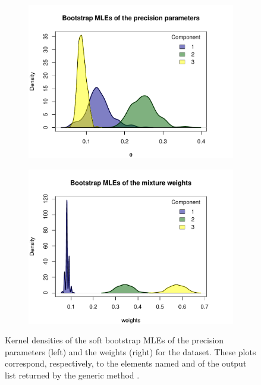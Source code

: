 \begin{figure}[t]
     \centering
     \begin{subfigure}[b]{0.49\textwidth}
         \centering
         \includegraphics[width=\textwidth]{figures/RJ2025_paper_boot1.pdf}
     \end{subfigure}
     \begin{subfigure}[b]{0.49\textwidth}
         \centering
         \includegraphics[width=\textwidth]{figures/RJ2025_paper_boot2.pdf}
      \end{subfigure}
       
        \caption{Kernel densities of the soft bootstrap MLEs of the precision parameters (left) and the weights (right) for the  dataset. These plots correspond, respectively, to the elements named  and  of the output list returned by the generic method .}
        \label{fig:boot_theta_weights}
\end{figure}



